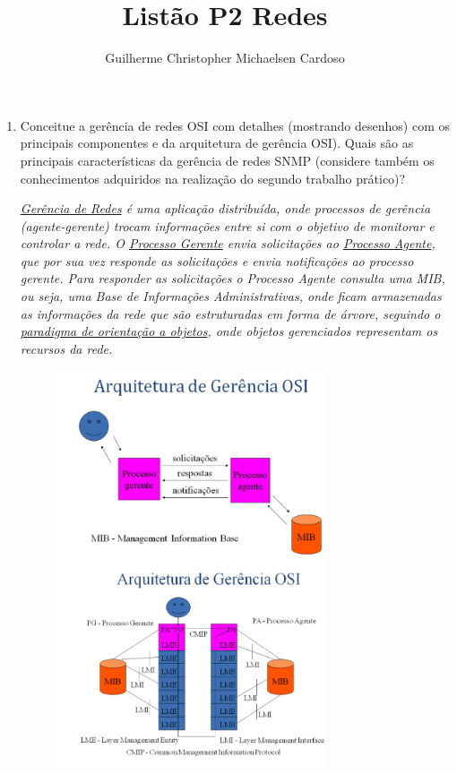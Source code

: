 \documentclass[10pt]{article}
\title{Listão P2 Redes}
\author{Guilherme Christopher Michaelsen Cardoso}
\begin{document}
\maketitle

\begin{enumerate}
    \item Conceitue a gerência de redes OSI com detalhes (mostrando desenhos)
    com os principais componentes e da arquitetura de gerência OSI). Quais
    são as principais características da gerência de redes SNMP (considere
    também os conhecimentos adquiridos na realização do segundo trabalho
    prático)? \\
    \par\textit {
        \underline{Gerência de Redes} é uma aplicação distribuída, onde 
        processos de gerência (agente-gerente) trocam informações entre si
        com o objetivo de monitorar e controlar a rede. O 
        \underline{Processo Gerente} envia solicitações ao 
        \underline{Processo Agente}, que por sua vez responde as solicitações
        e envia notificações ao processo gerente. Para responder as solicitações
        o Processo Agente consulta uma MIB, ou seja, uma Base de
        Informações Administrativas, onde ficam armazenadas as informações
        da rede que são estruturadas em forma de árvore, seguindo o 
        \underline{paradigma de orientação a objetos}, onde objetos gerenciados
        representam os recursos da rede. 
    }
    \begin{figure}[h!]
        \centering
         \includegraphics[width=80mm]{figura.png}
        \label{fig:figuragay}
    \end{figure}


\end{enumerate}
\end{document}
